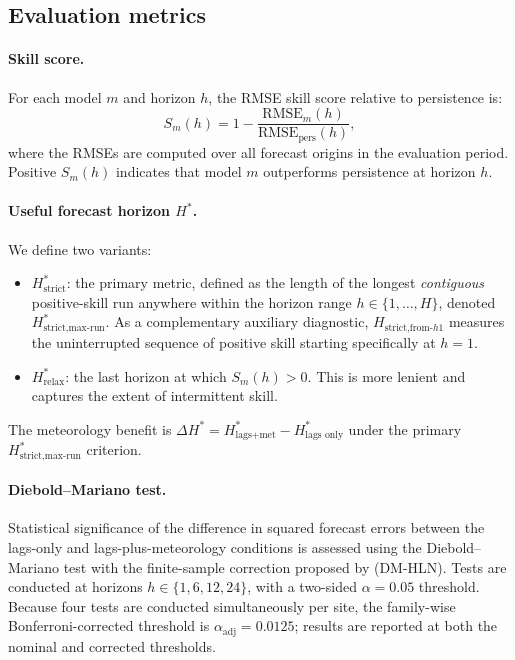 \documentclass[12pt,a4paper]{article}
\begin{document}
\subsection{Evaluation metrics}

\paragraph{Skill score.}
For each model $m$ and horizon $h$, the RMSE skill score relative to
persistence is:
\begin{equation}
  S_m(h) = 1 - \frac{\mathrm{RMSE}_m(h)}{\mathrm{RMSE}_{\text{pers}}(h)},
  \label{eq:skill}
\end{equation}
where the RMSEs are computed over all forecast origins in the evaluation period.
Positive $S_m(h)$ indicates that model $m$ outperforms persistence at horizon
$h$.

\paragraph{Useful forecast horizon $H^*$.}
We define two variants:
\begin{itemize}
  \item \textbf{$H^*_{\text{strict}}$}: the primary metric, defined as the length of the longest \emph{contiguous} positive-skill run anywhere within the horizon range $h \in \{1, \dots, H\}$, denoted $H^*_{\text{strict,max-run}}$. As a complementary auxiliary diagnostic, $H_{\text{strict,from-}h1}$ measures the uninterrupted sequence of positive skill starting specifically at $h = 1$.
  \item \textbf{$H^*_{\text{relax}}$}: the last horizon at which $S_m(h) > 0$.  This is more lenient and captures the extent of intermittent skill.
\end{itemize}
The meteorology benefit is $\Delta H^* = H^*_{\text{lags+met}} - H^*_{\text{lags only}}$ under the primary $H^*_{\text{strict,max-run}}$ criterion.

\paragraph{Diebold--Mariano test.}
Statistical significance of the difference in squared forecast errors between
the lags-only and lags-plus-meteorology conditions is assessed using the
Diebold--Mariano test \citep{Diebold1995} with the finite-sample correction
proposed by \citet{Harvey1997} (DM-HLN).  Tests are conducted at horizons
$h \in \{1, 6, 12, 24\}$, with a two-sided $\alpha = 0.05$ threshold.
Because four tests are conducted simultaneously per site, the family-wise
Bonferroni-corrected threshold is $\alpha_{\text{adj}} = 0.0125$; results are
reported at both the nominal and corrected thresholds.
\end{document}
